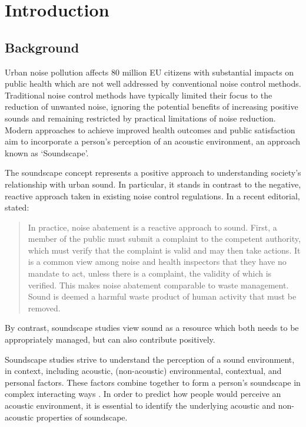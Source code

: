 \chapter{Introduction}
\label{ch:intro}

\section{Background}
Urban noise pollution affects 80 million EU citizens with substantial impacts on public health which are not well addressed by conventional noise control methods. Traditional noise control methods have typically limited their focus to the reduction of unwanted noise, ignoring the potential benefits of increasing positive sounds and remaining restricted by practical limitations of noise reduction. Modern approaches to achieve improved health outcomes and public satisfaction aim to incorporate a person's perception of an acoustic environment, an approach known as `Soundscape'.

The soundscape concept represents a positive approach to understanding society's relationship with urban sound. In particular, it stands in contrast to the negative, reactive approach taken in existing noise control regulations. In a recent editorial, \citet{Axelsson2020Soundscape} stated:

\begin{quote}
  In practice, noise abatement is a reactive approach to sound. First, a member of the public must submit a complaint to the competent authority, which must verify that the complaint is valid and may then take actions. It is a common view among noise and health inspectors that they have no mandate to act, unless there is a complaint, the validity of which is verified. This makes noise abatement comparable to waste management. Sound is deemed a harmful waste product of human activity that must be removed.
\end{quote}

By contrast, soundscape studies view sound as a resource which both needs to be appropriately managed, but can also contribute positively. %

Soundscape studies strive to understand the perception of a sound environment, in context, including acoustic, (non-acoustic) environmental, contextual, and personal factors. These factors combine together to form a person's soundscape in complex interacting ways \citep{Berglund2006Tool}. In order to predict how people would perceive an acoustic environment, it is essential to identify the underlying acoustic and non-acoustic properties of soundscape.

